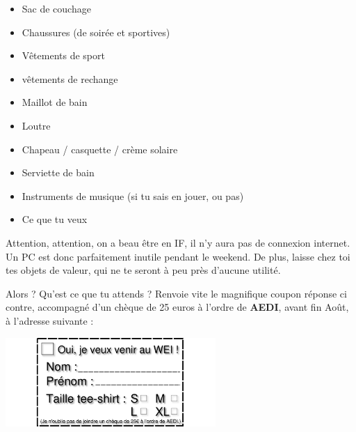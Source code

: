 \begin{itemize}
\item Sac de couchage
\item Chaussures (de soirée et sportives)
\item Vêtements de sport
\item vêtements de rechange
\item Maillot de bain
\item Loutre
\item Chapeau / casquette / crème solaire
\item Serviette de bain
\item Instruments de musique (si tu sais en jouer, ou pas)
\item Ce que tu veux
\end{itemize}

Attention, attention, on a beau être en IF, il n'y aura pas de connexion
internet. Un PC est donc parfaitement inutile pendant le weekend. De plus,
laisse chez toi tes objets de valeur, qui ne te seront à peu près d'aucune
utilité.

Alors ? Qu'est ce que tu attends ? Renvoie vite le magnifique coupon réponse ci
contre, accompagné d'un chèque de 25 euros à l'ordre de \textbf{AEDI}, avant fin Août,
à l'adresse suivante
:

\adresseCoupon

\columnbreak

\vspace{10cm}
\includegraphics[angle=90, width=8cm]{images/coupon.png}
